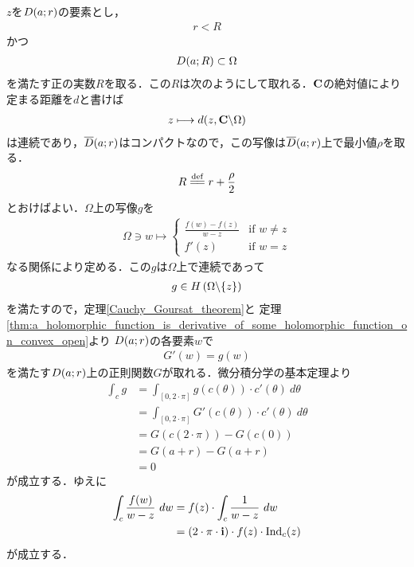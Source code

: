 	\begin{sketch}
		$z$を$D(a;r)$の要素とし，
		\begin{align}
			r < R
		\end{align}
		かつ
		\begin{align}
			D(a;R) \subset \Omega
		\end{align}
		を満たす正の実数$R$を取る．この$R$は次のようにして取れる．$\mathbf{C}$の絶対値により定まる距離を$d$と書けば
		\begin{align}
			z \longmapsto d(z,\mathbf{C} \backslash \Omega)
		\end{align}
		は連続であり，$\overline{D}(a;r)$はコンパクトなので，この写像は$\overline{D}(a;r)$上で最小値$\rho$を取る．
		\begin{align}
			R \defeq r + \frac{\rho}{2}
		\end{align}
		とおけばよい．$\Omega$上の写像$g$を
		\begin{align}
			\Omega \ni w \longmapsto
			\begin{cases}
				\displaystyle{\frac{f(w) - f(z)}{w - z}} & \mbox{if } w \neq z \\
				f'(z) & \mbox{if } w = z
			\end{cases}
		\end{align}
		なる関係により定める．この$g$は$\Omega$上で連続であって
		\begin{align}
			g \in H\left(\Omega \backslash \{z\}\right)
		\end{align}
		を満たすので，定理\ref{Cauchy_Goursat_theorem}と
		定理\ref{thm:a_holomorphic_function_is_derivative_of_some_holomorphic_function_on_convex_open}より
		$D(a;r)$の各要素$w$で
		\begin{align}
			G'(w) = g(w)
		\end{align}
		を満たす$D(a;r)$上の正則関数$G$が取れる．微分積分学の基本定理より
		\begin{align}
			\int_{c} g
			&= \int_{[0,2 \cdot \pi]} g(c(\theta)) \cdot c'(\theta)\ d\theta \\
			&= \int_{[0,2 \cdot \pi]} G'(c(\theta)) \cdot c'(\theta)\ d\theta \\
			&= G(c(2 \cdot \pi)) - G(c(0)) \\
			&= G(a + r) - G(a + r) \\
			&= 0
		\end{align}
		が成立する．ゆえに
		\begin{align}
			\int_{c} \frac{f(w)}{w - z}\ dw 
			&= f(z) \cdot \int_{c} \frac{1}{w - z}\ dw \\
			&= (2 \cdot \pi \cdot \mathbf{i}) \cdot f(z) \cdot \operatorname{Ind}_{c}(z)
		\end{align}
		が成立する．
		\QED
	\end{sketch}
	